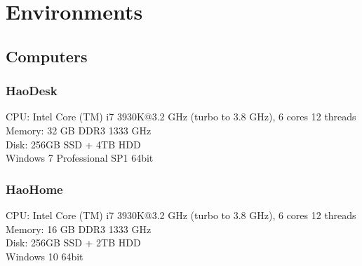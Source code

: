 \section{Environments}

\subsection{Computers}
\subsubsection{HaoDesk}
\label{HaoDesk}

CPU: Intel Core (TM) i7 3930K@3.2 GHz (turbo to 3.8 GHz), 6 cores 12 threads\\
Memory: 32 GB DDR3 1333 GHz\\
Disk: 256GB SSD + 4TB HDD\\ 
Windows 7 Professional SP1 64bit


\subsubsection{HaoHome}
\label{HaoHome}

CPU: Intel Core (TM) i7 3930K@3.2 GHz (turbo to 3.8 GHz), 6 cores 12 threads\\
Memory: 16 GB DDR3 1333 GHz\\
Disk: 256GB SSD + 2TB HDD\\ 
Windows 10 64bit


%
%






 

